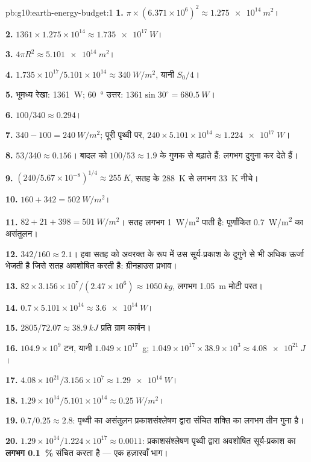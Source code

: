 \begin{solution}{pb:g10:earth-energy-budget:1}
\textbf{1.} $\pi \times (6.371\times10^6)^2 \approx \qty{1.275e14}{m^2}$।

\textbf{2.} $1361 \times 1.275\times10^{14} \approx \qty{1.735e17}{W}$।

\textbf{3.} $4\pi R^2 \approx \qty{5.101e14}{m^2}$।

\textbf{4.} $1.735\times10^{17}/5.101\times10^{14} \approx \qty{340}{W/m^2}$,
यानी $S_0/4$।

\textbf{5.} भूमध्य रेखा: \qty{1361}{W}; \qty{60}{\degree} उत्तर: $1361 \sin
30^\circ = \qty{680.5}{W}$।

\textbf{6.} $100/340 \approx 0.294$।

\textbf{7.} $340 - 100 = \qty{240}{W/m^2}$; पूरी पृथ्वी पर, $240 \times
5.101\times10^{14} \approx \qty{1.224e17}{W}$।

\textbf{8.} $53/340 \approx 0.156$। बादल  को
$100/53 \approx 1.9$ के गुणक से बढ़ाते हैं: लगभग दुगुना कर देते हैं।

\textbf{9.} $(240/5.67\times10^{-8})^{1/4} \approx \qty{255}{K}$, सतह के
\qty{288}{K} से लगभग \qty{33}{K} नीचे।

\textbf{10.} $160 + 342 = \qty{502}{W/m^2}$।

\textbf{11.} $82 + 21 + 398 = \qty{501}{W/m^2}$। सतह लगभग
\qty{1}{W/m^2} पाती है: पूर्णांकित \qty{0.7}{W/m^2} का असंतुलन।

\textbf{12.} $342/160 \approx 2.1$। हवा सतह को अवरक्त के रूप में उस सूर्य-प्रकाश के
दुगुने से भी अधिक ऊर्जा भेजती है जिसे सतह अवशोषित करती है: ग्रीनहाउस
प्रभाव।

\textbf{13.} $82 \times 3.156\times10^7/(2.47\times10^6) \approx
\qty{1050}{kg}$, लगभग \qty{1.05}{m} मोटी परत।

\textbf{14.} $0.7 \times 5.101\times10^{14} \approx \qty{3.6e14}{W}$।

\textbf{15.} $2805/72.07 \approx \qty{38.9}{kJ}$ प्रति ग्राम कार्बन।

\textbf{16.} $104.9\times10^9$ टन, यानी $1.049\times10^{17}$~g;
$1.049\times10^{17} \times 38.9\times10^3 \approx \qty{4.08e21}{J}$।

\textbf{17.} $4.08\times10^{21}/3.156\times10^7 \approx \qty{1.29e14}{W}$।

\textbf{18.} $1.29\times10^{14}/5.101\times10^{14} \approx
\qty{0.25}{W/m^2}$।

\textbf{19.} $0.7/0.25 \approx 2.8$: पृथ्वी का असंतुलन प्रकाशसंश्लेषण द्वारा संचित
शक्ति का लगभग तीन गुना है।

\textbf{20.} $1.29\times10^{14}/1.224\times10^{17} \approx 0.0011$:
प्रकाशसंश्लेषण पृथ्वी द्वारा अवशोषित सूर्य-प्रकाश का \textbf{लगभग \qty{0.1}{\percent}}
संचित करता है --- एक हज़ारवाँ भाग।
\end{solution}
